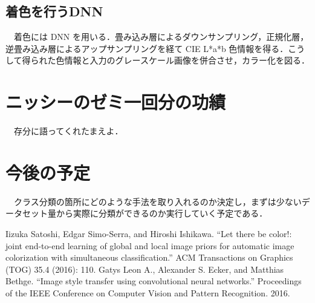 \documentclass[10pt]{jarticle}
\begin{document}
\subsection{着色を行うDNN}
\ \ 着色には DNN を用いる．畳み込み層によるダウンサンプリング，正規化層，逆畳み込み層によるアップサンプリングを経て CIE L*a*b 色情報を得る．こうして得られた色情報と入力のグレースケール画像を併合させ，カラー化を図る．
\section{ニッシーのゼミ一回分の功績}
\ \ 存分に語ってくれたまえよ．
\section{今後の予定}
\ \ クラス分類の箇所にどのような手法を取り入れるのか決定し，まずは少ないデータセット量から実際に分類ができるのか実行していく予定である．
\begin{thebibliography}{99}
 Iizuka Satoshi, Edgar Simo-Serra, and Hiroshi Ishikawa. ``Let there be color!: joint end-to-end learning of global and local image priors for automatic image colorization with simultaneous classification.'' ACM Transactions on Graphics (TOG) 35.4 (2016): 110.
 Gatys Leon A., Alexander S. Ecker, and Matthias Bethge. ``Image style transfer using convolutional neural networks.'' Proceedings of the IEEE Conference on Computer Vision and Pattern Recognition. 2016.
\end{thebibliography}
\end{document}
